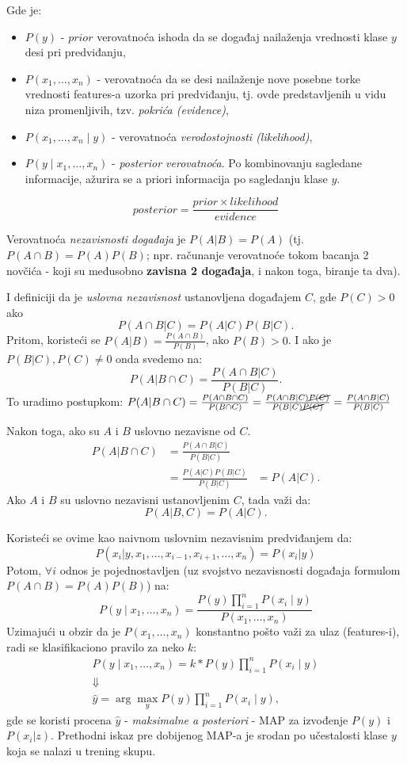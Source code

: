 \documentclass[fontsize=12bp, paper=a4]{scrarticle}
\begin{document}
Gde je:
\begin{itemize}
    \item $P(y)$ - $prior$ verovatnoća ishoda da se događaj nailaženja vrednosti klase $y$ desi pri predviđanju,
    \item $P(x_1, \dots, x_n)$ - verovatnoća da se desi nailaženje nove posebne torke vrednosti features-a uzorka pri predviđanju, tj. ovde predstavljenih u vidu niza promenljivih, tzv. \textit{pokrića (evidence)},
    \item $P(x_1, \dots, x_n \mid y)$ - verovatnoća \textit{verodostojnosti (likelihood)},
    \item $P(y \mid x_1, \dots, x_n)$ - \textit{posterior verovatnoća}. Po kombinovanju sagledane informacije, ažurira se a priori informacija po sagledanju klase $y$.\cite{nb-names}
\end{itemize}

$$posterior = \frac{prior \times likelihood}{{evidence}}$$

\vbox{}
Verovatnoća \textit{nezavisnosti događaja}\cite{probabiliy-independence} je $P(A|B)=P(A)$ (tj. $P(A \cap B)=P(A)P(B)$; npr. računanje verovatnoće tokom bacanja 2 novčića - koji su međusobno \textbf{zavisna 2 događaja}, i nakon toga, biranje ta dva). 

I definiciji da je \textit{uslovna nezavisnost} ustanovljena događajem $C$, gde $P(C) > 0$ ako 
$$P(A \cap B|C)=P(A|C)P(B|C).$$
Pritom, koristeći se $P(A|B)=\frac{P(A \cap B)}{P(B)}$, ako $P(B) > 0$. I ako je $P(B|C), P(C)\ne 0$ onda svedemo na:
$$P(A|B\cap C)=\frac{P(A \cap B|C)}{P(B|C)}.$$
To uradimo postupkom: $P(A|B\cap C)= \frac{P(A\cap B\cap C)}{P(B\cap C)} = \frac{P(A \cap B|C)\cancel{P(C)}}{P(B|C)\cancel{P(C)}} =\frac{P(A \cap B|C)}{P(B|C)}$

\newpage

Nakon toga, ako su $A$ i $B$ uslovno nezavisne od $C$.
$$\begin{aligned}
    P(A|B\cap C) &=\frac{P(A \cap B|C)}{P(B|C)} \\
    &=\frac{P(A|C)P(B|C)}{P(B|C)}
    &=P(A|C).
\end{aligned}
$$
Ako $A$ i $B$ su uslovno nezavisni ustanovljenim $C$, tada važi da:
$$P(A | B,C)=P(A|C).$$

Koristeći se ovime kao naivnom uslovnim nezavisnim predviđanjem da:
$$P(x_i | y, x_1, \dots, x_{i-1}, x_{i+1}, \dots, x_n) = P(x_i | y)$$
Potom, $\forall i$ odnos je pojednostavljen (uz svojstvo nezavisnosti događaja formulom $P(A \cap B)=P(A)P(B)$) na:
$$P(y \mid x_1, \dots, x_n) = \frac{P(y) \prod_{i=1}^{n} P(x_i \mid y)}
{P(x_1, \dots, x_n)}$$
Uzimajući u obzir da je $P(x_1, \dots, x_n)$ konstantno pošto važi za ulaz (features-i), radi se klasifikaciono pravilo za neko $k$:
$$\begin{aligned}P(y \mid x_1, \dots, x_n) = k* P(y) \prod_{i=1}^{n} P(x_i \mid y)\\\Downarrow\\\hat{y} = \arg\max_y P(y) \prod_{i=1}^{n} P(x_i \mid y),\end{aligned}$$
gde se koristi procena $\hat{y}$ - \textit{maksimalne a posteriori} - MAP za izvođenje $P(y)$ i $P(x_i|z)$. Prethodni iskaz pre dobijenog MAP-a je srodan po učestalosti klase $y$  koja se nalazi u trening skupu.
\end{document}
